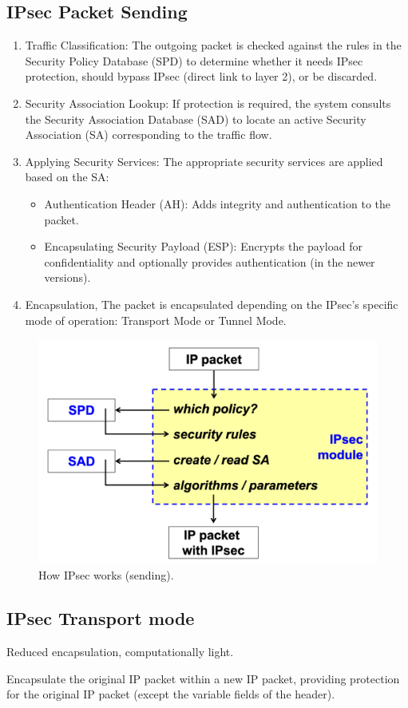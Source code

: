 \subsection{IPsec Packet Sending}


    \begin{enumerate}
        \item Traffic Classification: The outgoing packet is checked against the rules in the Security Policy Database (SPD) to determine whether it needs IPsec protection, should bypass IPsec (direct link to layer 2), or be discarded.
        \item Security Association Lookup: If protection is required, the system consults the Security Association Database (SAD) to locate an active Security Association (SA) corresponding to the traffic flow.
        \item Applying Security Services: The appropriate security services are applied based on the SA:
        \begin{itemize}
            \item Authentication Header (AH): Adds integrity and authentication to the packet.
            \item Encapsulating Security Payload (ESP): Encrypts the payload for confidentiality and optionally provides authentication (in the newer versions).
        \end{itemize}
        \item Encapsulation, The packet is encapsulated depending on the IPsec's specific mode of operation: Transport Mode or Tunnel Mode.
    \end{enumerate}



\begin{figure}[H]
    \centering
    \includegraphics[width=0.3\linewidth]{Images/NetSec/ipsect_sending.png}
    \caption{How IPsec works (sending).}
    \label{fig:IPsec_packet_sending}
\end{figure}

\subsection{IPsec Transport mode}
\begin{center}
    Reduced encapsulation, computationally light.
\end{center}
Encapsulate the original IP packet within a new IP packet, providing protection for the original IP packet (except the variable fields of the header).

